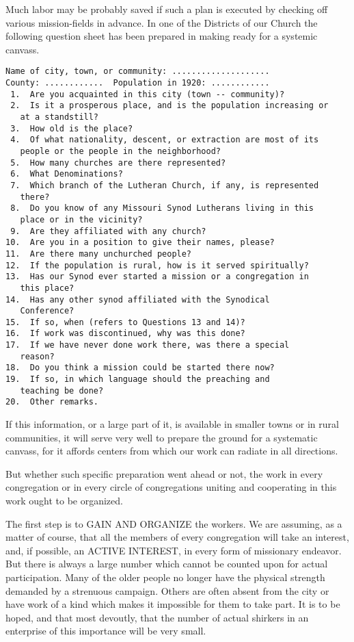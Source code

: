 \documentclass[
]{book}
\begin{document}
Much labor may be probably saved if such a plan is executed by checking off various mission-fields in advance. In one of the Districts of our Church the following question sheet has been prepared in making ready for a systemic canvass.

\begin{verbatim}
Name of city, town, or community: ....................
County: ............  Population in 1920: ............
 1.  Are you acquainted in this city (town -- community)?
 2.  Is it a prosperous place, and is the population increasing or
   at a standstill?
 3.  How old is the place?  
 4.  Of what nationality, descent, or extraction are most of its
   people or the people in the neighborhood?
 5.  How many churches are there represented?
 6.  What Denominations?
 7.  Which branch of the Lutheran Church, if any, is represented
   there?
 8.  Do you know of any Missouri Synod Lutherans living in this
   place or in the vicinity?
 9.  Are they affiliated with any church?
10.  Are you in a position to give their names, please?
11.  Are there many unchurched people?
12.  If the population is rural, how is it served spiritually?
13.  Has our Synod ever started a mission or a congregation in
   this place?
14.  Has any other synod affiliated with the Synodical 
   Conference?
15.  If so, when (refers to Questions 13 and 14)?
16.  If work was discontinued, why was this done?
17.  If we have never done work there, was there a special
   reason?
18.  Do you think a mission could be started there now?
19.  If so, in which language should the preaching and 
   teaching be done?
20.  Other remarks.
\end{verbatim}

If this information, or a large part of it, is available in smaller towns or in rural communities, it will serve very well to prepare the ground for a systematic canvass, for it affords centers from which our work can radiate in all directions.

But whether such specific preparation went ahead or not, the work in every congregation or in every circle of congregations uniting and cooperating in this work ought to be organized.

The first step is to GAIN AND ORGANIZE the workers. We are assuming, as a matter of course, that all the members of every congregation will take an interest, and, if possible, an ACTIVE INTEREST, in every form of missionary endeavor. But there is always a large number which cannot be counted upon for actual participation. Many of the older people no longer have the physical strength demanded by a strenuous campaign. Others are often absent from the city or have work of a kind which makes it impossible for them to take part. It is to be hoped, and that most devoutly, that the number of actual shirkers in an enterprise of this importance will be very small.
\end{document}
